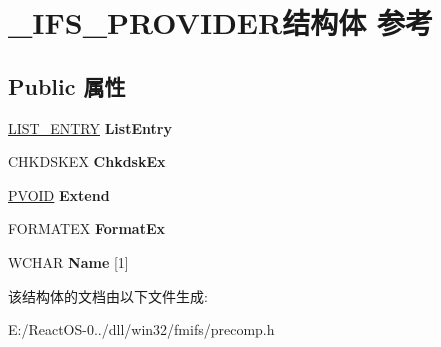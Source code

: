 \hypertarget{struct___i_f_s___p_r_o_v_i_d_e_r}{}\section{\+\_\+\+I\+F\+S\+\_\+\+P\+R\+O\+V\+I\+D\+E\+R结构体 参考}
\label{struct___i_f_s___p_r_o_v_i_d_e_r}
\subsection*{Public 属性}
\begin{DoxyCompactItemize}
\item 
\mbox{\label{struct___i_f_s___p_r_o_v_i_d_e_r_a46c68616c20d4ad73f64e0b0c36f5ecb}} 
\hyperlink{struct___l_i_s_t___e_n_t_r_y}{L\+I\+S\+T\+\_\+\+E\+N\+T\+RY} {\bfseries List\+Entry}
\item 
\mbox{\label{struct___i_f_s___p_r_o_v_i_d_e_r_a547bfc2908702791884b1bc248945d13}} 
C\+H\+K\+D\+S\+K\+EX {\bfseries Chkdsk\+Ex}
\item 
\mbox{\label{struct___i_f_s___p_r_o_v_i_d_e_r_a0ff501ca6d376e9f318cc317b610e1a5}} 
\hyperlink{interfacevoid}{P\+V\+O\+ID} {\bfseries Extend}
\item 
\mbox{\label{struct___i_f_s___p_r_o_v_i_d_e_r_ae4772b945440181ea512c2bc68194b67}} 
F\+O\+R\+M\+A\+T\+EX {\bfseries Format\+Ex}
\item 
\mbox{\label{struct___i_f_s___p_r_o_v_i_d_e_r_aecdf2910b730facff4d1fa9a524f4d84}} 
W\+C\+H\+AR {\bfseries Name} \mbox{[}1\mbox{]}
\end{DoxyCompactItemize}


该结构体的文档由以下文件生成\+:\begin{DoxyCompactItemize}
\item 
E\+:/\+React\+O\+S-\/0../dll/win32/fmifs/precomp.\+h\end{DoxyCompactItemize}
